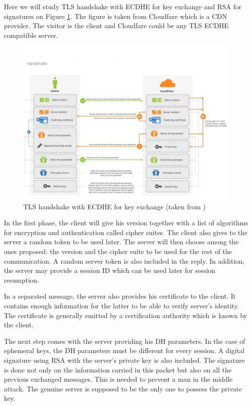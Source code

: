 Here we will study TLS handshake with ECDHE for key exchange and RSA for signatures on Figure \ref{fig:tls_handshake}. The figure is taken from Cloudfare which is a CDN provider. The visitor is the client and Cloudfare could be any TLS ECDHE compatible server. 



\begin{figure}[!h]
\centering
\includegraphics[width=\linewidth]{images/ECDHEhandshake}
\caption{TLS handshake with ECDHE for key exchange (taken from \cite{tlsdhhandshake})}
\label{fig:tls_handshake}
\end{figure}

In the first phase, the client will give his version together with a list of algorithms for encryption and authentication called cipher suites. The client also gives to the server a random token to be used later. The server will then choose among the ones proposed: the version and the cipher suite to be used for the rest of the communication. A random server token is also included in the reply. In addition, the server may provide a session ID which can be used later for session resumption.

In a separated message, the server also provides his certificate to the client. It contains enough information for the latter to be able to verify server's identity. The certificate is generally emitted by a certification authority which is known by the client.

The next step comes with the server providing his DH parameters. In the case of ephemeral keys, the DH parameters must be different for every session. A digital signature using RSA with the server's private key is also included. The signature is done not only on the information carried in this packet but also on all the previous exchanged messages. This is needed to prevent a man in the middle attack. The genuine server is supposed to be the only one to possess the private key.

